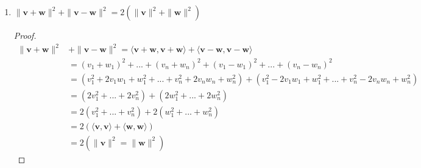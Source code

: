 \documentclass{tufte-book}
\theoremstyle{mytheoremstyle}
\theoremstyle{mylemstyle}
\theoremstyle{mydefstyle}
\begin{document}
\begin{enumerate}
\item $\|\mathbf{v} + \mathbf{w} \|^2 + \|\mathbf{v} -\mathbf{w}\|^2 = 2(\|\mathbf{v}\|^2 + \|\mathbf{w}\|^2)$
\begin{proof}
\begin{align*}
\|\mathbf{v} + \mathbf{w} \|^2 &+ \|\mathbf{v} -\mathbf{w}\|^2 = 
  \langle \mathbf{v} + \mathbf{w},\mathbf{v} + \mathbf{w}\rangle +
  \langle \mathbf{v} - \mathbf{w},\mathbf{v} - \mathbf{w}\rangle \\
&= (v_1 +w_1)^2 + ... + (v_n+w_n)^2 + (v_1-w_1)^2 + ... + (v_n-w_n)^2\\
&= (v_1^2 + 2v_1w_1 + w_1^2 +...+v_n^2 + 2v_nw_n + w_n^2) + (v_1^2 - 2v_1w_1 + w_1^2 +...+v_n^2 - 2v_nw_n + w_n^2) \\
&= (2v_1^2 +...+2v_n^2) + (2w_1^2 +...+ 2w_n^2)\\
&= 2(v_1^2 +...+v_n^2) + 2(w_1^2 +...+w_n^2) \\
&= 2(\langle\mathbf{v},\mathbf{v}\rangle + \langle\mathbf{w},\mathbf{w}\rangle)\\
&= 2(\|\mathbf{v}\|^2 = \|\mathbf{w}\|^2)
\end{align*}
\end{proof}
\end{enumerate}
\end{document}
